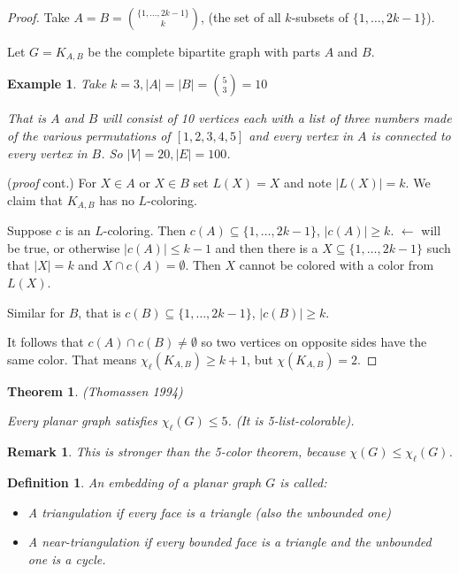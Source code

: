 \documentclass[a4paper]{article}
\theoremstyle{plain}
\newtheorem{theorem}[lemma]{Theorem}
\newtheorem{definition}[lemma]{Definition}
\theoremstyle{myremark}
\newtheorem{remark}[lemma]{Remark}
\newtheorem{example}[lemma]{Example}
\begin{document}
\begin{proof}
Take $A=B=\binom{\{1,\ldots,2k-1\}}{k}$, (the set of all $k$-subsets of $\{1,\ldots,2k-1\}$).

Let $G=K_{A,B}$ be the complete bipartite graph with parts $A$ and $B$.
\begin{example}
Take $k=3, |A|=|B|=\binom{5}{3}=10$

That is $A$ and $B$ will consist of 10 vertices each with a list of three numbers made of the various permutations of $[1,2,3,4,5]$ and every vertex in $A$ is connected to every vertex in $B$. So $|V|=20, |E|=100$.
\end{example}

(\textit{proof} cont.)
For $X \in A$ or $X \in B$ set $L(X)=X$ and note $|L(X)|=k.$
We claim that $K_{A,B}$ has no $L$-coloring.

Suppose $c$ is an $L$-coloring. Then $c(A)\subseteq \{1,\ldots,2k-1\}$, $|c(A)|\geq k$. $\leftarrow$ will be true, or otherwise $|c(A)|\leq k-1$ and then there is a $X\subseteq\{1,\ldots,2k-1\}$ such that $|X|=k$ and $X\cap c(A)=\emptyset$. Then $X$ cannot be colored with a color from $L(X)$.

Similar for $B$, that is  $c(B)\subseteq \{1,\ldots,2k-1\}$, $|c(B)|\geq k$.

It follows  that $c(A)\cap c(B)\neq \emptyset$ so two vertices on opposite sides have the same color. That means $\chi_{\ell}(K_{A,B})\geq k+1$, but $\chi(K_{A,B})=2$.
\end{proof}

\begin{theorem}
(Thomassen 1994)

Every planar graph satisfies $\chi_{\ell}(G)\leq 5$. (It is 5-list-colorable).  
\end{theorem}
\begin{remark}
This is stronger than the 5-color theorem, because $\chi(G)\leq \chi_{\ell}(G)$.
\end{remark}

\begin{definition}
An embedding of a planar graph $G$ is called:
\begin{itemize}
\item A triangulation if every face is a triangle (also the unbounded one)
\item A near-triangulation if every bounded face is a triangle and the unbounded one is a cycle.
\end{itemize}
\end{definition}
\end{document}
